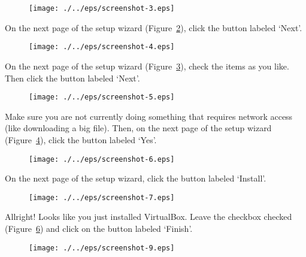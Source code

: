 \begin{figure}[ht]
  \centering
    \texttt{[image: ./../eps/screenshot-3.eps]}
  \caption{}
  \label{fig:screenshot-3}
\end{figure}


On the next page of the setup wizard (Figure~\ref{fig:screenshot-4}), click the button labeled `Next'.

\begin{figure}[ht]
  \centering
    \texttt{[image: ./../eps/screenshot-4.eps]}
  \caption{}
  \label{fig:screenshot-4}
\end{figure}
\clearpage

On the next page of the setup wizard (Figure~\ref{fig:screenshot-5}), check the items as you like. Then click the button labeled `Next'.

\begin{figure}[ht]
  \centering
    \texttt{[image: ./../eps/screenshot-5.eps]}
  \caption{}
  \label{fig:screenshot-5}
\end{figure}


Make sure you are not currently doing something that requires network access (like downloading a big file). Then, on the next page of the setup wizard (Figure~\ref{fig:screenshot-6}), click the button labeled `Yes'.

\begin{figure}[ht]
  \centering
    \texttt{[image: ./../eps/screenshot-6.eps]}
  \caption{}
  \label{fig:screenshot-6}
\end{figure}
\clearpage

On the next page of the setup wizard, click the button labeled `Install'.

\begin{figure}[ht]
  \centering
    \texttt{[image: ./../eps/screenshot-7.eps]}
  \caption{}
  \label{fig:screenshot-7}
\end{figure}



Allright! Looks like you just installed VirtualBox. Leave the checkbox checked (Figure~\ref{fig:screenshot-9}) and click on the button labeled `Finish'.
\begin{figure}[ht]
  \centering
    \texttt{[image: ./../eps/screenshot-9.eps]}
  \caption{}
  \label{fig:screenshot-9}
\end{figure}
\clearpage


